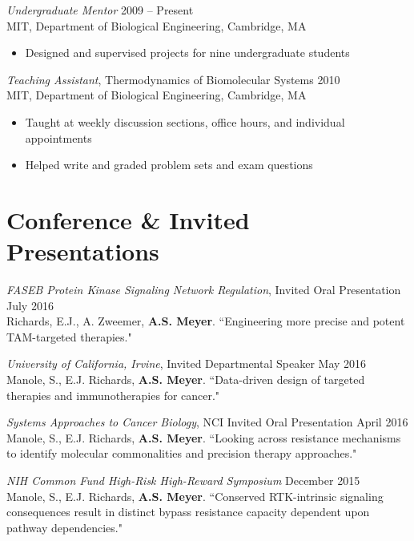 \documentclass[11pt]{res}
\begin{document}
\begin{resume}
{\sl Undergraduate Mentor} \hfill 2009 -- Present \\
MIT, Department of Biological Engineering, Cambridge, MA
\begin{itemize} \itemsep -2pt %
\item Designed and supervised projects for nine undergraduate students
\end{itemize}
	

{\sl Teaching Assistant}, Thermodynamics of Biomolecular Systems \hfill 2010 \\
MIT, Department of Biological Engineering, Cambridge, MA
\begin{itemize} \itemsep -2pt %
\item Taught at weekly discussion sections, office hours, and individual appointments
\item Helped write and graded problem sets and exam questions
\end{itemize}



\clearpage
\section{Conference \& Invited Presentations}

{\sl FASEB Protein Kinase Signaling Network Regulation}, Invited Oral Presentation \hfill July 2016 \\
Richards, E.J., A. Zweemer, {\bf A.S. Meyer}. ``Engineering more precise and potent TAM-targeted therapies."






{\sl University of California, Irvine}, Invited Departmental Speaker \hfill May 2016 \\
Manole, S., E.J. Richards, {\bf A.S. Meyer}. ``Data-driven design of targeted therapies and immunotherapies for cancer."

{\sl Systems Approaches to Cancer Biology}, NCI Invited Oral Presentation \hfill April 2016 \\
Manole, S., E.J. Richards, {\bf A.S. Meyer}. ``Looking across resistance mechanisms to identify molecular commonalities and precision therapy approaches."

{\sl NIH Common Fund High-Risk High-Reward Symposium} \hfill December 2015 \\
Manole, S., E.J. Richards, {\bf A.S. Meyer}. ``Conserved RTK-intrinsic signaling consequences result in distinct bypass resistance capacity dependent upon pathway dependencies."


\end{resume}
\end{document}

